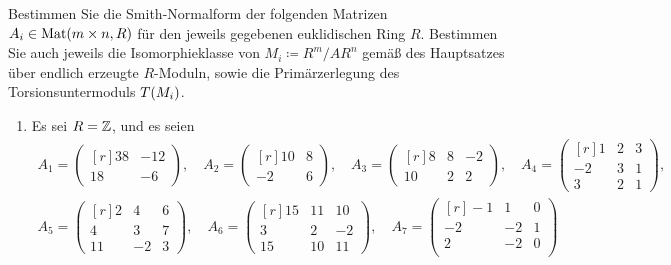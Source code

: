 \begin{question}[subtitle = Smith-Normalform Und Kokerne]
    Bestimmen Sie die Smith-Normalform der folgenden Matrizen $A_i \in \operatorname{Mat}(m \times n, R)$ für den jeweils gegebenen euklidischen Ring $R$.
    Bestimmen Sie auch jeweils die Isomorphieklasse von $M_i \coloneqq R^m/AR^n$ gemäß des Hauptsatzes über endlich erzeugte $R$-Moduln, sowie die Primärzerlegung des Torsionsuntermoduls $T(M_i)$.
  \begin{enumerate}
    \item
      Es sei $R = \mathbb{Z}$, und es seien
      \begin{gather*}
        A_1 =
        \begin{pmatrix*}[r]
          38  & -12 \\
          18  &  -6
        \end{pmatrix*},
      \quad
        A_2 =
        \begin{pmatrix*}[r]
          10 & 8 \\
          -2 & 6
        \end{pmatrix*},
      \quad
        A_3 =
        \begin{pmatrix*}[r]
            8 & 8 & -2 \\
          10 & 2 &  2
        \end{pmatrix*},
      \quad
        A_4 =
        \begin{pmatrix*}[r]
           1  & 2 & 3 \\
          -2  & 3 & 1 \\
           3  & 2 & 1
        \end{pmatrix*},
      \\
        A_5 =
        \begin{pmatrix*}[r]
           2  &  4  & 6 \\
           4  &  3  & 7 \\
          11  & -2  & 3
        \end{pmatrix*},
      \quad
        A_6 =
        \begin{pmatrix*}[r]
          15  & 11  & 10 \\
           3  &  2  & -2 \\
          15  & 10  & 11
        \end{pmatrix*},
      \quad
        A_7 = 
        \begin{pmatrix*}[r]
           -1 &  1  & 0 \\
           -2 & -2  & 1 \\
            2 & -2  & 0 \\

\end{pmatrix*}
\end{gather*}
\end{enumerate}
\end{question}
